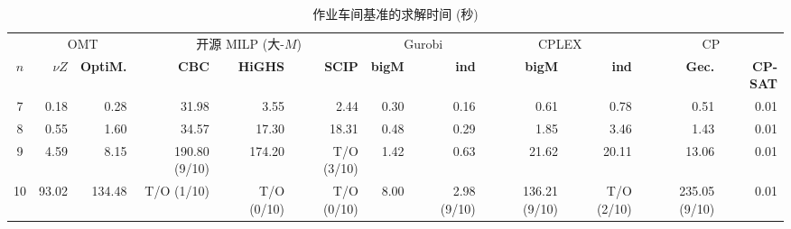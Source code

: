 \begin{table}[!htbp]
\centering
\caption{作业车间基准的求解时间 (秒)}
\label{tab:exp-jobshop}
\footnotesize
\setlength{\tabcolsep}{4pt}
\begin{tabular}{@{}c rr rrr rr rr rr@{}}
\toprule
& \multicolumn{2}{c}{OMT} & \multicolumn{3}{c}{开源 MILP (大-$M$)} & \multicolumn{2}{c}{Gurobi} & \multicolumn{2}{c}{CPLEX} & \multicolumn{2}{c}{CP} \\
\cmidrule(lr){2-3}\cmidrule(lr){4-6}\cmidrule(lr){7-8}\cmidrule(lr){9-10}\cmidrule(lr){11-12}
\textbf{$n$} & \textbf{$\nu Z$} & \textbf{OptiM.} & \textbf{CBC} & \textbf{HiGHS} & \textbf{SCIP} & \textbf{bigM} & \textbf{ind} & \textbf{bigM} & \textbf{ind} & \textbf{Gec.} & \textbf{CP-SAT} \\
\midrule
7 & 0.18 & 0.28 & 31.98 & 3.55 & 2.44 & 0.30 & 0.16 & 0.61 & 0.78 & 0.51 & 0.01 \\
8 & 0.55 & 1.60 & 34.57 & 17.30 & 18.31 & 0.48 & 0.29 & 1.85 & 3.46 & 1.43 & 0.01 \\
9 & 4.59 & 8.15 & 190.80 (9/10) & 174.20 & T/O (3/10) & 1.42 & 0.63 & 21.62 & 20.11 & 13.06 & 0.01 \\
10 & 93.02 & 134.48 & T/O (1/10) & T/O (0/10) & T/O (0/10) & 8.00 & 2.98 (9/10) & 136.21 (9/10) & T/O (2/10) & 235.05 (9/10) & 0.01 \\
\bottomrule
\end{tabular}
\end{table}
